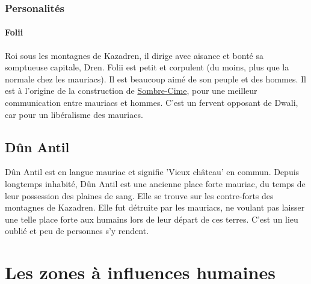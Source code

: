 \subsubsection{Personalités}
\paragraph{Folii}
\hypertarget {folii}{}Roi sous les montagnes de Kazadren, il dirige avec aisance et bonté sa somptueuse capitale, Dren.
Folii est petit et corpulent (du moins, plus que la normale chez les mauriacs).
Il est beaucoup aimé de son peuple et des hommes. Il est à l'origine de la construction de \hyperlink {sombrecime}{Sombre-Cime}, pour une meilleur communication entre mauriacs et hommes. 
C'est un fervent opposant de Dwali, car pour un libéralisme des mauriacs.
\subsection{Dûn Antil}
Dûn Antil est en langue mauriac et signifie ’Vieux château’ en commun. Depuis longtemps inhabité, Dûn Antil est une ancienne place forte mauriac, du temps de leur possession des plaines de sang. Elle se trouve sur les contre-forts des montagnes de Kazadren. Elle fut détruite par les mauriacs, ne voulant pas laisser une telle place forte aux humains lors de leur départ de ces terres. C’est un lieu oublié et peu de personnes s’y rendent. 
\section{Les zones à influences humaines}
